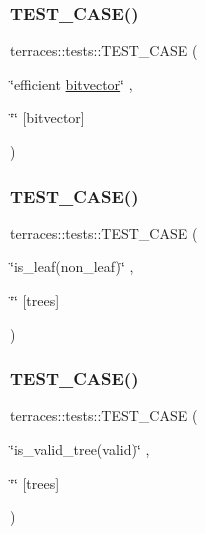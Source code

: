 \subsubsection{\texorpdfstring{T\+E\+S\+T\+\_\+\+C\+A\+S\+E()}{TEST\_CASE()}\hspace{0.1cm}{\footnotesize\ttfamily [49/78]}}
{\footnotesize\ttfamily terraces\+::tests\+::\+T\+E\+S\+T\+\_\+\+C\+A\+SE (\begin{DoxyParamCaption}\item[{\char`\"{}efficient \hyperlink{namespaceterraces_a1b526fb554dff829f7ad51eb21d5ed06}{bitvector}\char`\"{}}]{,  }\item[{\char`\"{}\char`\"{}}]{\mbox{[}bitvector\mbox{]} }\end{DoxyParamCaption})}

\mbox{\label{namespaceterraces_1_1tests_af8e3364bb90d0e106aa6049a7f9d8813}} 
\subsubsection{\texorpdfstring{T\+E\+S\+T\+\_\+\+C\+A\+S\+E()}{TEST\_CASE()}\hspace{0.1cm}{\footnotesize\ttfamily [50/78]}}
{\footnotesize\ttfamily terraces\+::tests\+::\+T\+E\+S\+T\+\_\+\+C\+A\+SE (\begin{DoxyParamCaption}\item[{\char`\"{}is\+\_\+leaf(non\+\_\+leaf)\char`\"{}}]{,  }\item[{\char`\"{}\char`\"{}}]{\mbox{[}trees\mbox{]} }\end{DoxyParamCaption})}

\mbox{\label{namespaceterraces_1_1tests_aa482803c2007edddc7f42937de3b5a27}} 
\subsubsection{\texorpdfstring{T\+E\+S\+T\+\_\+\+C\+A\+S\+E()}{TEST\_CASE()}\hspace{0.1cm}{\footnotesize\ttfamily [51/78]}}
{\footnotesize\ttfamily terraces\+::tests\+::\+T\+E\+S\+T\+\_\+\+C\+A\+SE (\begin{DoxyParamCaption}\item[{\char`\"{}is\+\_\+valid\+\_\+tree(valid)\char`\"{}}]{,  }\item[{\char`\"{}\char`\"{}}]{\mbox{[}trees\mbox{]} }\end{DoxyParamCaption})}

